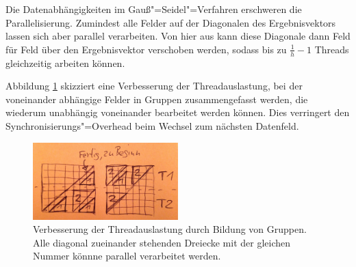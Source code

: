 \documentclass[paper = a4]{scrartcl}
\begin{document}


Die Datenabhängigkeiten im Gauß"=Seidel"=Verfahren erschweren die Parallelisierung. Zumindest alle Felder auf der Diagonalen des Ergebnisvektors lassen sich aber parallel verarbeiten. Von hier aus kann diese Diagonale dann Feld für Feld über den Ergebnisvektor verschoben werden, sodass bis zu \(\frac{1}{h} - 1\) Threads gleichzeitig arbeiten können.


Abbildung \ref{fig:gaussseideldreiecke} skizziert eine Verbesserung der Threadauslastung, bei der voneinander abhängige Felder in Gruppen zusammengefasst werden, die wiederum unabhängig voneinander bearbeitet werden können. Dies verringert den Synchronisierungs"=Overhead beim Wechsel zum nächsten Datenfeld.

\begin{figure}
    \centering
    \includegraphics[width=0.5\textwidth]{gaussseideldreiecke}
    \caption{Verbesserung der Threadauslastung durch Bildung von Gruppen. Alle diagonal zueinander stehenden Dreiecke mit der gleichen Nummer könnne parallel verarbeitet werden.}
    \label{fig:gaussseideldreiecke}
\end{figure}
\end{document}
